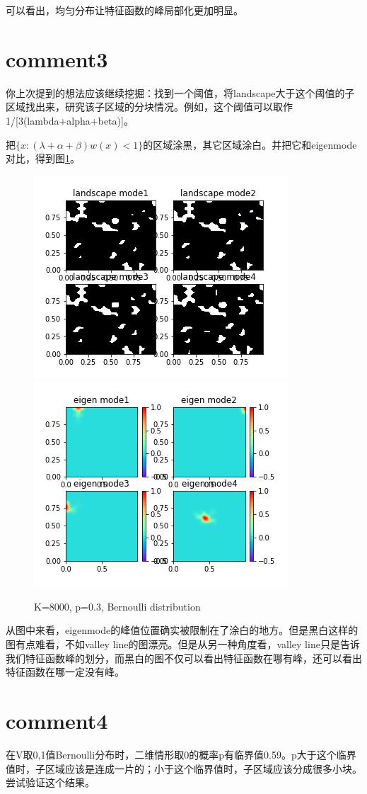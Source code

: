 \documentclass[UTF8,12pt]{article}
\begin{document}
可以看出，均匀分布让特征函数的峰局部化更加明显。


\section{comment3}

你上次提到的想法应该继续挖掘：找到一个阈值，将landscape大于这个阈值的子区域找出来，研究该子区域的分块情况。例如，这个阈值可以取作1/[3(lambda+alpha+beta)]。

把$\{x: (\lambda+\alpha+\beta)w(x) < 1\}$的区域涂黑，其它区域涂白。并把它和eigenmode对比，得到图\ref{fig11}。

\begin{figure}[htbp]
    \centering
    \includegraphics[width=0.45\linewidth]{../pics/wm11}
    \includegraphics[width=0.45\linewidth]{../pics/u11}
    \caption{K=8000, p=0.3, Bernoulli distribution}
    \label{fig11}
\end{figure}

从图中来看，eigenmode的峰值位置确实被限制在了涂白的地方。但是黑白这样的图有点难看，不如valley line的图漂亮。但是从另一种角度看，valley line只是告诉我们特征函数峰的划分，而黑白的图不仅可以看出特征函数在哪有峰，还可以看出特征函数在哪一定没有峰。

\section{comment4}

在V取{0,1}值Bernoulli分布时，二维情形取0的概率p有临界值0.59。p大于这个临界值时，子区域应该是连成一片的；小于这个临界值时，子区域应该分成很多小块。尝试验证这个结果。
\end{document}
